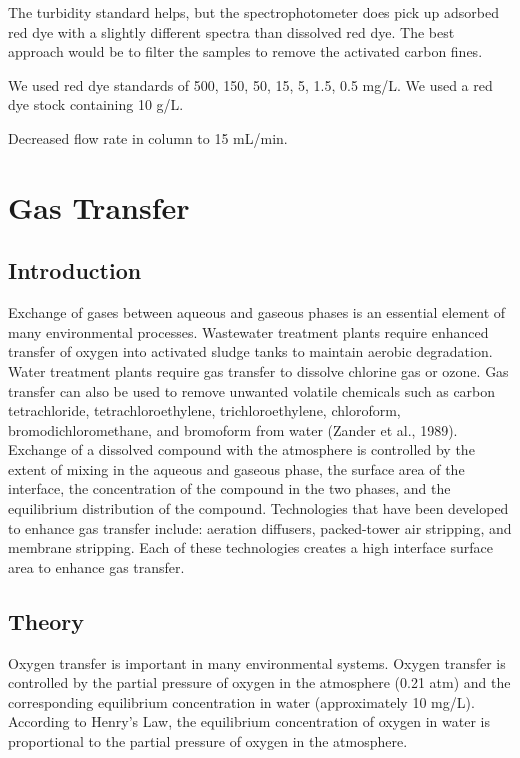 \documentclass[letterpaper,10pt,english]{sphinxmanual}
\begin{document}
The turbidity standard helps, but the spectrophotometer does pick up adsorbed red dye with a slightly different spectra than dissolved red dye. The best approach would be to filter the samples to remove the activated carbon fines.

We used red dye standards of 500, 150, 50, 15, 5, 1.5, 0.5 mg/L. We used a red dye stock containing 10 g/L.

Decreased flow rate in column to 15 mL/min.


\chapter{Gas Transfer}
\label{\detokenize{Gas_Transfer/Gas_Transfer:gas-transfer}}\label{\detokenize{Gas_Transfer/Gas_Transfer:title-gas-transfer}}\label{\detokenize{Gas_Transfer/Gas_Transfer::doc}}

\section{Introduction}
\label{\detokenize{Gas_Transfer/Gas_Transfer:introduction}}\label{\detokenize{Gas_Transfer/Gas_Transfer:heading-gas-transfer-introduction}}
Exchange of gases between aqueous and gaseous phases is an essential element of many environmental processes. Wastewater treatment plants require enhanced transfer of oxygen into activated sludge tanks to maintain aerobic degradation. Water treatment plants require gas transfer to dissolve chlorine gas or ozone. Gas transfer can also be used to remove unwanted volatile chemicals such as carbon tetrachloride, tetrachloroethylene, trichloroethylene, chloroform, bromodichloromethane, and bromoform from water (Zander et al., 1989). Exchange of a dissolved compound with the atmosphere is controlled by the extent of mixing in the aqueous and gaseous phase, the surface area of the interface, the concentration of the compound in the two phases, and the equilibrium distribution of the compound. Technologies that have been developed to enhance gas transfer include: aeration diffusers, packed-tower air stripping, and membrane stripping. Each of these technologies creates a high interface surface area to enhance gas transfer.


\section{Theory}
\label{\detokenize{Gas_Transfer/Gas_Transfer:theory}}\label{\detokenize{Gas_Transfer/Gas_Transfer:heading-gas-transfer-theory}}
Oxygen transfer is important in many environmental systems. Oxygen transfer is controlled by the partial pressure of oxygen in the atmosphere (0.21 atm) and the corresponding equilibrium concentration in water (approximately 10 mg/L). According to Henry’s Law, the equilibrium concentration of oxygen in water is proportional to the partial pressure of oxygen in the atmosphere.
\end{document}
